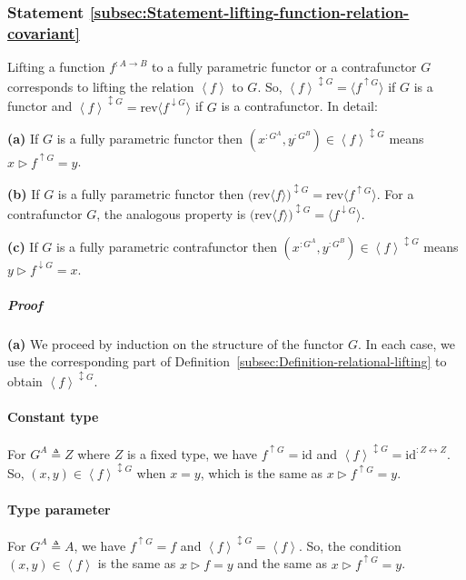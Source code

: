 \subsubsection{Statement \label{subsec:Statement-lifting-function-relation-covariant}\ref{subsec:Statement-lifting-function-relation-covariant}}

Lifting a function $f^{:A\rightarrow B}$ to a fully parametric functor
or a contrafunctor $G$ corresponds to lifting the relation $\left<f\right>$
to $G$. So, $\left<f\right>^{\updownarrow G}=\langle f^{\uparrow G}\rangle$
if $G$ is a functor and $\left<f\right>^{\updownarrow G}=\text{rev}\langle f^{\downarrow G}\rangle$
if $G$ is a contrafunctor. In detail:

\textbf{(a)} If $G$ is a fully parametric functor then $(x^{:G^{A}},y^{:G^{B}})\in\left<f\right>^{\updownarrow G}$
means $x\triangleright f^{\uparrow G}=y$.

\textbf{(b)} If $G$ is a fully parametric functor then $\big(\text{rev}\langle f\rangle\big)^{\updownarrow G}=\text{rev}\langle f^{\uparrow G}\rangle$.
For a contrafunctor $G$, the analogous property is $\big(\text{rev}\langle f\rangle\big)^{\updownarrow G}=\langle f^{\downarrow G}\rangle$.

\textbf{(c)} If $G$ is a fully parametric contrafunctor then $(x^{:G^{A}},y^{:G^{B}})\in\left<f\right>^{\updownarrow G}$
means $y\triangleright f^{\downarrow G}=x$.

\subparagraph{Proof}

\textbf{(a)} We proceed by induction on the structure of the functor
$G$. In each case, we use the corresponding part of Definition~\ref{subsec:Definition-relational-lifting}
to obtain $\left<f\right>^{\updownarrow G}$.

\paragraph{Constant type}

For $G^{A}\triangleq Z$ where $Z$ is a fixed type, we have $f^{\uparrow G}=\text{id}$
and $\left<f\right>^{\updownarrow G}=\text{id}^{:Z\leftrightarrow Z}$.
So, $(x,y)\in\left<f\right>^{\updownarrow G}$ when $x=y$, which
is the same as $x\triangleright f^{\uparrow G}=y$.

\paragraph{Type parameter}

For $G^{A}\triangleq A$, we have $f^{\uparrow G}=f$ and $\left<f\right>^{\updownarrow G}=\left<f\right>$.
So, the condition $(x,y)\in\left<f\right>$ is the same as $x\triangleright f=y$
and the same as $x\triangleright f^{\uparrow G}=y$.

